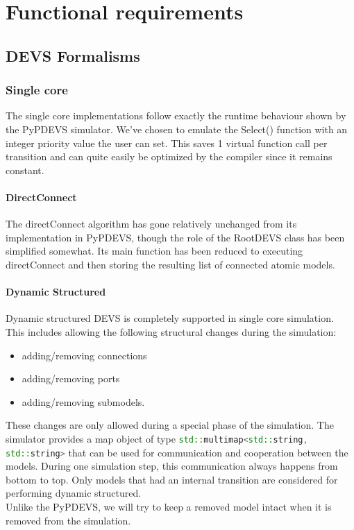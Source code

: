 \documentclass[8pt,a4paper]{report}
\begin{document}
\chapter{Functional requirements}
\section{DEVS Formalisms}
\subsection{Single core}
The single core implementations follow exactly the runtime behaviour shown by the PyPDEVS simulator. We've chosen to emulate the Select() function with an integer priority value the user can set. This saves 1 virtual function call per transition and can quite easily be optimized by the compiler since it remains constant.
\subsubsection{DirectConnect}
The directConnect algorithm has gone relatively unchanged from its implementation in PyPDEVS, though the role of the RootDEVS class has been simplified somewhat. Its main function has been reduced to executing directConnect and then storing the resulting list of connected atomic models.
\subsubsection{Dynamic Structured}
Dynamic structured DEVS is completely supported in single core simulation. This includes allowing the following structural changes during the simulation:
\begin{itemize}
	\item adding/removing connections
	\item adding/removing ports
	\item adding/removing submodels.
\end{itemize}
These changes are only allowed during a special phase of the simulation. The simulator provides a map object of type \lstinline[language=C++,basicstyle=\small\color{black}]{std::multimap<std::string, std::string>} that can be used for communication and cooperation between the models. During one simulation step, this communication always happens from bottom to top. Only models that had an internal transition are considered for performing dynamic structured.\\
Unlike the PyPDEVS, we will try to keep a removed model intact when it is removed from the simulation.
\end{document}
